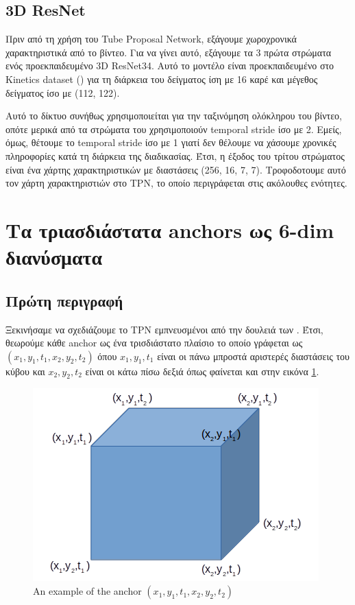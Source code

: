 \documentclass{report}
\begin{document}
\subsection{3D ResNet}
Πριν από τη χρήση του Tube Proposal Network, εξάγουμε  χωροχρονικά χαρακτηριστικά από το βίντεο. Για να γίνει αυτό, εξάγουμε τα 3 πρώτα στρώματα ενός
προεκπαιδευμένο 3D ResNet34. Αυτό το μοντέλο είναι προεκπαιδευμένο στο Kinetics dataset (\cite{DBLP:journals/corr/KayCSZHVVGBNSZ17}) για τη διάρκεια του δείγματος ίση με
16 καρέ και μέγεθος δείγματος ίσο με (112, 122).  \par
Αυτό το δίκτυο συνήθως χρησιμοποιείται για την ταξινόμηση ολόκληρου του βίντεο, οπότε μερικά από τα στρώματα του χρησιμοποιούν temporal stride ίσο με 2.
Εμείς, όμως, θέτουμε το temporal stride  ίσο με 1 γιατί δεν θέλουμε να χάσουμε χρονικές πληροφορίες κατά τη διάρκεια της διαδικασίας.
Έτσι, η έξοδος του τρίτου στρώματος είναι ένα χάρτης χαρακτηριστικών με διαστάσεις (256, 16, 7, 7). Τροφοδοτουμε αυτό τον χάρτη  χαρακτηριστιών στο TPN,
το οποίο περιγράφεται στις ακόλουθες ενότητες.

\section{Τα τριασδιάστατα  anchors ως  6-dim διανύσματα}
\subsection{Πρώτη περιγραφή}
Ξεκινήσαμε να σχεδιάζουμε το TPN εμπνευσμένοι από την δουλειά των \cite{DBLP:journals/corr/HouCS17}. Έτσι, θεωρούμε κάθε anchor ως ένα
τρισδιάστατο πλαίσιο  το οποίο γράφεται ως $(x_1, y_1, t_1, x_2, y_2, t_2)$ όπου $x_1, y_1, t_1$ είναι
οι πάνω μπροστά αριστερές διαστάσεις του κύβου και $x_2, y_2, t_2$ είναι οι κάτω πίσω δεξιά όπως φαίνεται και στην εικόνα \ref{fig:anchor_6d}.
\begin{figure}[h]
  \centering
  \includegraphics[scale=0.5]{anchor_6d}
  \caption{An example of the anchor $(x_1,y_1,t_1,x_2,y_2,t_2)$}
  \label{fig:anchor_6d}
\end{figure}
\end{document}
